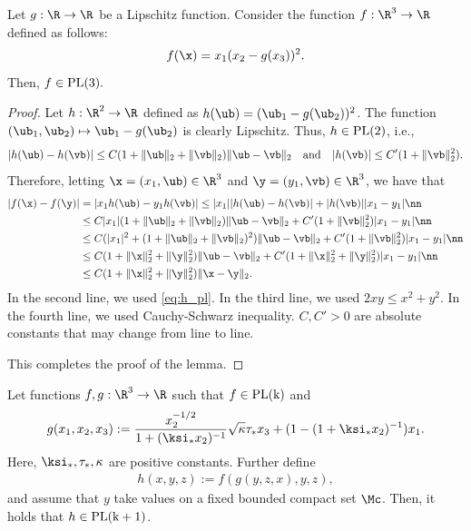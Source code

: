 \begin{lemma}
Let $g:\R\rightarrow\R$ be a Lipschitz function. Consider the function $f:\R^3\rightarrow\R$ defined as follows:
$$
f(\x) = x_1(x_2-g(x_3))^2.
$$
Then, $f\in\rm{PL}(3).$
\end{lemma}

\begin{proof}
Let $h:\R^2\rightarrow\R$ defined as $h(\ub)=(\ub_1-g(\ub_2))^2$. The function $(\ub_1,\ub_2)\mapsto\ub_1-g(\ub_2)$ is clearly Lipschitz. Thus, $h\in\rm{PL}(2)$, i.e., 
\begin{align}
|h(\ub)-h(\vb)| \leq C(1+\|\ub\|_2+\|\vb\|_2)\|\ub-\vb\|_2\quad\text{and}\quad |h(\vb)|\leq C'(1+\|\vb\|_2^2).\label{eq:h_pl}
\end{align} 
Therefore, letting $\x=(x_1,\ub)\in\R^3$ and $\y=(y_1,\vb)\in\R^3$, we have that 
\begin{align}
|f(\x)-f(\y)| &= |x_1h(\ub) - y_1h(\vb)| \leq |x_1||h(\ub)-h(\vb)| + |h(\vb)| |x_1-y_1|\nn\\
&\leq C|x_1|(1+\|\ub\|_2+\|\vb\|_2)\|\ub-\vb\|_2 + C'(1+\|\vb\|_2^2)|x_1-y_1| \nn\\
&\leq C(|x_1|^2+(1+\|\ub\|_2+\|\vb\|_2)^2)\|\ub-\vb\|_2 + C'(1+\|\vb\|_2^2)|x_1-y_1| \nn\\
&\leq C(1+\|\x\|_2^2+\|\y\|_2^2)\|\ub-\vb\|_2 + C'(1+\|\x\|_2^2+\|\y\|_2^2)|x_1-y_1| \nn\\
&\leq C(1+\|\x\|_2^2+\|\y\|_2^2)\|\x-\y\|_2.
\end{align}
In the second line, we used \eqref{eq:h_pl}. In the third line, we used $2xy\leq x^2+y^2$. In the fourth line, we used Cauchy-Schwarz inequality. $C,C'>0$ are absolute constants that may change from line to line.

This completes the proof of the lemma.
\end{proof}



\begin{lemma}\label{lem:hPL}
Let functions $f,g:\R^3\rightarrow\R$ such that $f\in\rm{PL}(k)$ and 
$$
g(x_1,x_2,x_3) := \frac{x_2^{-1/2}}{1+(\ksi_* x_2)^{-1}}\sqrt{\kappa}\tau_* x_3 + (1-(1+\ksi_*x_2)^{-1})x_1.
$$
Here, $\ksi_*,\tau_*,\kappa$ are positive constants. 
Further define 
\begin{align}
h(x,y,z) := f\left(g(y,z,x),y,z\right),
\end{align}
and assume that $y$ take values on a fixed bounded compact set $\Mc$.
Then, it holds that $h\in\rm{PL}(k+1)$.
\end{lemma}

